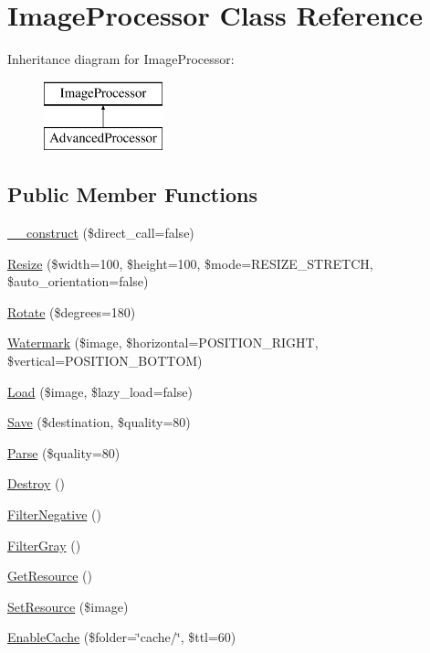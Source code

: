 \hypertarget{class_image_processor}{
\section{ImageProcessor Class Reference}
\label{class_image_processor}
}
Inheritance diagram for ImageProcessor:\begin{figure}[H]
\begin{center}
\leavevmode
\includegraphics[height=2.000000cm]{class_image_processor}
\end{center}
\end{figure}
\subsection*{Public Member Functions}
\begin{DoxyCompactItemize}
\item 
\hyperlink{class_image_processor_a025fface9738730639d72d61f4961838}{\_\-\_\-construct} (\$direct\_\-call=false)
\item 
\hyperlink{class_image_processor_a741991b58a904e7d360ba248c0635a3a}{Resize} (\$width=100, \$height=100, \$mode=RESIZE\_\-STRETCH, \$auto\_\-orientation=false)
\item 
\hyperlink{class_image_processor_a2022a4c342adae35c0c98bd84b5189ac}{Rotate} (\$degrees=180)
\item 
\hyperlink{class_image_processor_a4467f85d2e8929da1ba99b14b5ced06a}{Watermark} (\$image, \$horizontal=POSITION\_\-RIGHT, \$vertical=POSITION\_\-BOTTOM)
\item 
\hyperlink{class_image_processor_a084ac19ce186da9093c5f3e110613f25}{Load} (\$image, \$lazy\_\-load=false)
\item 
\hyperlink{class_image_processor_a5e84b5fa1a09c453046710cf4a372235}{Save} (\$destination, \$quality=80)
\item 
\hyperlink{class_image_processor_aff78404716b7c12faf48b4d90d86304f}{Parse} (\$quality=80)
\item 
\hyperlink{class_image_processor_af283f640a2de333ced2616be941ee5dd}{Destroy} ()
\item 
\hyperlink{class_image_processor_a5e3a491a7d0b485efa3171b4f0ee4341}{FilterNegative} ()
\item 
\hyperlink{class_image_processor_ab2ad017b33e16bd351ded87dcccdc844}{FilterGray} ()
\item 
\hyperlink{class_image_processor_a02b33fb5a0b2d51c228ad72a745c235f}{GetResource} ()
\item 
\hyperlink{class_image_processor_a3d6489e0bd2240e539582a6f12ccf39e}{SetResource} (\$image)
\item 
\hyperlink{class_image_processor_a41530fad864e3c73788e176fab35ab59}{EnableCache} (\$folder=\char`\"{}cache/\char`\"{}, \$ttl=60)
\end{DoxyCompactItemize}
